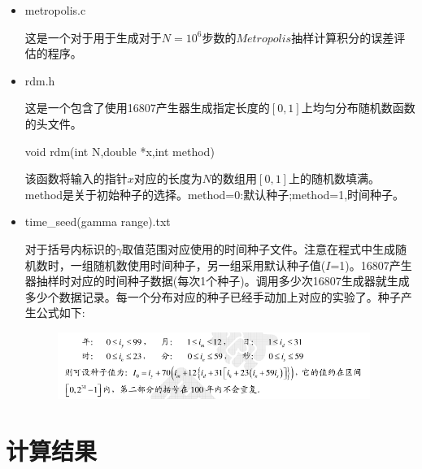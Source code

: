 \documentclass[UTF8]{ctexart}
\begin{document}
		\begin{itemize}
		\item metropolis.c
		
		这是一个对于用于生成对于$N=10^{6}$步数的$Metropolis$抽样计算积分的误差评估的程序。
	
		
		\item rdm.h
		
		这是一个包含了使用16807产生器生成指定长度的$[0,1]$上均匀分布随机数函数的头文件。
		
		\subitem void rdm(int N,double *x,int method)
		
		该函数将输入的指针$x$对应的长度为$N$的数组用$[0,1]$上的随机数填满。method是关于初始种子的选择。method=0:默认种子;method=1,时间种子。
		
		\item time\_seed(gamma range).txt
		
		对于括号内标识的$\gamma$取值范围对应使用的时间种子文件。注意在程式中生成随机数时，一组随机数使用时间种子，另一组采用默认种子值($I$=1)。16807产生器抽样时对应的时间种子数据(每次1个种子)。调用多少次16807生成器就生成多少个数据记录。每一个分布对应的种子已经手动加上对应的实验了。种子产生公式如下:
		
		
		
		\begin{figure}[H]
			\centering  %
			\includegraphics[width=4in]{../result/1.png}
		\end{figure}
		
	\end{itemize}
	

	\section{计算结果}
\end{document}
